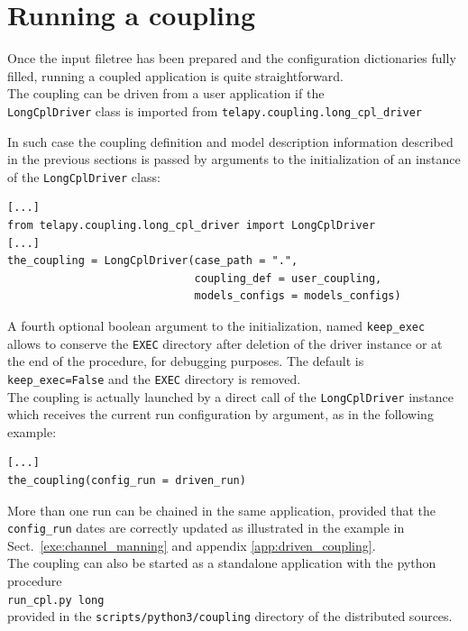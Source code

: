 \chapter{Running a coupling}\label{running}
Once the input filetree has been prepared and the configuration
dictionaries fully filled, running a coupled application is quite
straightforward.\\

The coupling can be driven from a user application if the\\
\texttt{LongCplDriver} class is imported from
\texttt{telapy.coupling.long\_cpl\_driver}

In such case the coupling definition and model description
information described in the previous sections is
passed by arguments to the initialization of an instance of the
\texttt{LongCplDriver} class:
\begin{verbatim}
[...]
from telapy.coupling.long_cpl_driver import LongCplDriver
[...]
the_coupling = LongCplDriver(case_path = ".",
                             coupling_def = user_coupling,
                             models_configs = models_configs)
\end{verbatim}
A fourth optional boolean argument to the initialization, named
\texttt{keep\_exec} allows to conserve the \texttt{EXEC} directory after
deletion of the driver instance or at the end of the procedure, for
debugging purposes. The default is \texttt{keep\_exec=False} and the \texttt{EXEC} directory
is removed.\\

The coupling is actually launched by a direct call of the
\texttt{LongCplDriver} instance which receives the current run
configuration by argument, as in the following example:
\begin{verbatim}
[...]
the_coupling(config_run = driven_run)
\end{verbatim}

More than one run can be chained in the same application, provided
that the \texttt{config\_run} dates are correctly updated as
illustrated in the example in Sect.~\ref{exe:channel_manning} and
appendix \ref{app:driven_coupling}.
$~$\\

The coupling can also be started as a standalone application with the
python procedure\\
\texttt{run\_cpl.py long}\\
provided in the \texttt{scripts/python3/coupling} directory of the
distributed sources.
\newline

